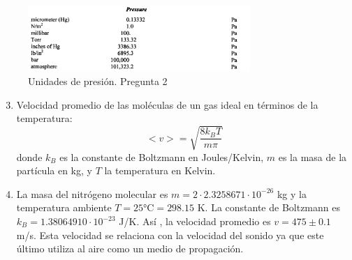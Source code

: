     \begin{figure}
        \centering
        \includegraphics[width=0.75\textwidth]{Imagenes/Unidad/U2/Unidades de presion del libro.jpg}
        \caption{Unidades de presión. Pregunta 2}
        \label{fig:my_label}
    \end{figure}
\begin{enumerate}
    
    \setcounter{enumi}{2}
    \item %
    Velocidad promedio de las moléculas de un gas ideal en términos de la temperatura:
    \begin{equation}
        < v > = \sqrt{\frac{8k_B T}{m \pi}}
    \end{equation}
    donde $k_B$ es la constante de Boltzmann en Joules/Kelvin, $m$ es la masa de la partícula en kg, y $T$ la temperatura en Kelvin.
    \item %
     La masa del nitrógeno molecular es  $ m = 2\cdot 2.3258671 \cdot 10^{-26}$  kg y la temperatura ambiente $T = 25$°C$= 298.15$ K. La constante de Boltzmann es $k_B = 1.38064910 \cdot 10^{-23}$ J/K. Así , la velocidad promedio es $v = 475 \pm 0.1$ m/s. Esta velocidad se relaciona con la velocidad del sonido ya que este último utiliza al aire como un medio de propagación.
     
\end{enumerate}
